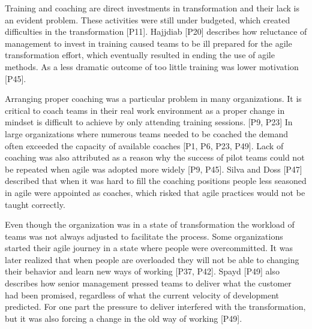 
Training and coaching are direct investments in transformation and their lack is
an evident problem. These activities were still under budgeted, which
created difficulties in the transformation [P11].
Hajjdiab [P20] describes how reluctance of management to invest in training
caused teams to be ill prepared for the agile transformation effort, which
eventually resulted in ending the use of agile methods. As a less dramatic
outcome of too little training was lower motivation [P45].

Arranging proper coaching was a particular problem in many organizations. It is
critical to coach teams in their real work environment as a proper change in
mindset is difficult to achieve by only attending training sessions. [P9, P23]
In large
organizations where numerous teams needed to be coached the demand often
exceeded the capacity of available coaches [P1, P6, P23, P49]. Lack of coaching
was also attributed as a reason why the success of pilot teams could not be
repeated when agile was adopted more widely [P9, P45].
Silva and Doss [P47] described that when it was hard to fill the coaching
positions people less seasoned in agile were appointed as coaches, which risked
that agile practices would not be taught correctly.




Even though the organization was in a state of transformation the workload of
teams was not always adjusted to facilitate the process.
Some organizations started their agile journey in a state where people were
overcommitted. It was later realized that when people are overloaded they will
not be able to changing their behavior and learn new ways of working [P37, P42].
Spayd [P49] also describes how senior management pressed teams to deliver what
the customer had been promised, regardless of what the current velocity of
development predicted. For one part the pressure to deliver interfered with the
transformation, but it was also forcing a change in the old way of working
[P49].

